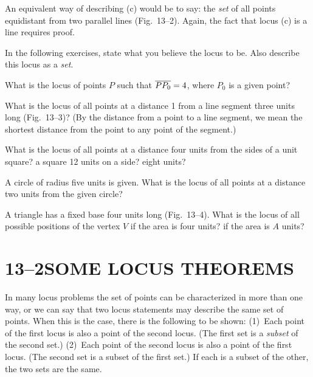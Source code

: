 \documentclass[11pt]{book}
\begin{document}
An equivalent way of describing (c) would be to say: the \emph{set} of all
points equidistant from two parallel lines (Fig.~13--2). Again, the fact that
locus (c) is a line requires proof.


In the following exercises, state what you believe the locus to be. Also
describe this locus as a \emph{set}.

\begin{exercisecols}
\begin{exlist}
\item What is the locus of points $P$ such that $\overline{PP_0} = 4$, where $P_0$ is
      a given point?
\item What is the locus of all points at a distance 1 from a line segment three
      units long (Fig.~13--3)? (By the distance from a point to a line segment,
      we mean the shortest distance from the point to any point of the
      segment.)
\exfig{\FIGXIIITHREE}
\item What is the locus of all points at a distance four units from the sides of
      a unit square? a square 12 units on a side? eight units?
\item A circle of radius five units is given. What is the locus of all points at
      a distance two units from the given circle?
\item A triangle has a fixed base four units long (Fig.~13--4). What is the
      locus of all possible positions of the vertex $V$ if the area is four
      units? if the area is $A$ units?
\exfig{\FIGXIIIFOUR}
\end{exlist}
\end{exercisecols}

\section*{13--2\quad SOME LOCUS THEOREMS}

In many locus problems the set of points can be characterized in more than one
way, or we can say that two locus statements may describe the same set of
points. When this is the case, there is the following to be shown: (1)~Each
point of the first locus is also a point of the second locus. (The first set is
a \emph{subset} of the second set.) (2)~Each point of the second locus is also a
point of the first locus. (The second set is a subset of the first set.) If each
is a subset of the other, the two sets are the same.
\end{document}
